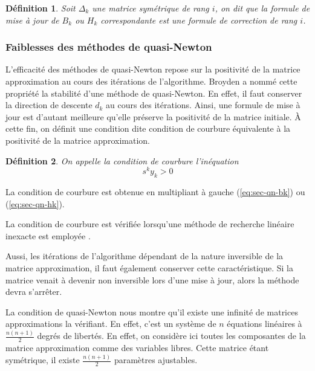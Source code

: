 \documentclass[3p, twocolumn]{elsarticle}
\newtheorem{definition}{Définition}[section]
\begin{document}
\begin{definition}
    Soit $\Delta_k$ une matrice symétrique de rang $i$, on dit que la formule de mise à jour de $B_k$ ou $H_k$ correspondante est une formule de correction de rang $i$. 
\end{definition}

\subsubsection{Faiblesses des méthodes de quasi-Newton}
L'efficacité des méthodes de quasi-Newton repose sur la positivité de la matrice approximation au cours des itérations de l'algorithme. Broyden a nommé cette propriété la stabilité d'une méthode de quasi-Newton. En effet, il faut conserver la direction de descente $d_k$ au cours des itérations. Ainsi, une formule de mise à jour est d'autant meilleure qu'elle préserve la positivité de la matrice initiale. \`A cette fin, on définit une condition dite condition de courbure équivalente à la positivité de la matrice approximation.

\begin{definition}
    On appelle la condition de courbure l'inéquation
    \begin{equation}
        s^ky_k > 0
    \end{equation}
\end{definition}
\begin{pf}
    La condition de courbure est obtenue en multipliant à gauche (\ref{eq:sec-qn-bk}) ou (\ref{eq:sec-qn-hk}).
\end{pf}
\begin{rmk}
    La condition de courbure est vérifiée lorsqu'une méthode de recherche linéaire inexacte est employée \cite{poly:mottelet2003}.
\end{rmk}

Aussi, les itérations de l'algorithme dépendant de la nature inversible de la matrice approximation, il faut également conserver cette caractéristique. Si la matrice venait à devenir non inversible lors d'une mise à jour, alors la méthode devra s'arrêter.

La condition de quasi-Newton nous montre qu'il existe une infinité de matrices approximations la vérifiant. En effet, c'est un système de $n$ équations linéaires à $\frac{n(n+1)}{2}$ degrés de libertés. En effet, on considère ici toutes les composantes de la matrice approximation comme des variables libres. Cette matrice étant symétrique, il existe $\frac{n(n+1)}{2}$ paramètres ajustables.
\end{document}
